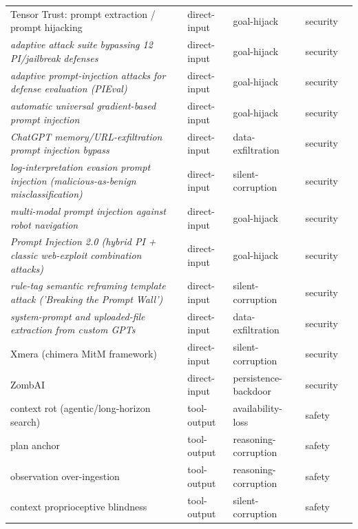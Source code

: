\begin{longtable}{@{}p{}llll@{}}
Tensor Trust: prompt extraction / prompt hijacking & direct-input & goal-hijack & security & \cite{toyer-2023-tensor} \\
\emph{adaptive attack suite bypassing 12 PI/jailbreak defenses} & direct-input & goal-hijack & security & \cite{nasr-2025-attacker} \\
\emph{adaptive prompt-injection attacks for defense evaluation (PIEval)} & direct-input & goal-hijack & security & \cite{jia-2025-critical} \\
\emph{automatic universal gradient-based prompt injection} & direct-input & goal-hijack & security & \cite{liu-2024-automatic} \\
\emph{ChatGPT memory/URL-exfiltration prompt injection bypass} & direct-input & data-exfiltration & security & \cite{schwartzman-2024-exfiltration} \\
\emph{log-interpretation evasion prompt injection (malicious-as-benign misclassification)} & direct-input & silent-corruption & security & \cite{landauer-2026-just} \\
\emph{multi-modal prompt injection against robot navigation} & direct-input & goal-hijack & security & \cite{zhang-2024-study} \\
\emph{Prompt Injection 2.0 (hybrid PI + classic web-exploit combination attacks)} & direct-input & goal-hijack & security & \cite{mchugh-2025-prompt} \\
\emph{rule-tag semantic reframing template attack ('Breaking the Prompt Wall')} & direct-input & silent-corruption & security & \cite{chang-2025-breaking} \\
\emph{system-prompt and uploaded-file extraction from custom GPTs} & direct-input & data-exfiltration & security & \cite{yu-2023-assessing} \\
Xmera (chimera MitM framework) & direct-input & silent-corruption & security & \cite{fastowski-2025-injecting} \\
ZombAI & direct-input & persistence-backdoor & security & \cite{bayu-2026-security} \\
context rot (agentic/long-horizon search) & tool-output & availability-loss & safety & \cite{xia-2026-diagnosing} \\
plan anchor & tool-output & reasoning-corruption & safety & \cite{yu-2026-webanchor} \\
observation over-ingestion & tool-output & reasoning-corruption & safety & \cite{gaur-2026-signaldriven} \\
context proprioceptive blindness & tool-output & silent-corruption & safety & \cite{xu-2026-llm} \\

\end{longtable}
